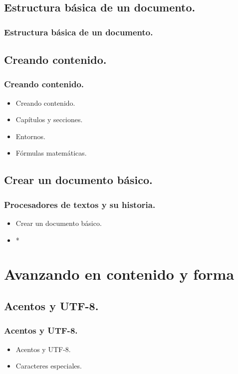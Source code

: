 \documentclass{beamer}
\begin{document}
\subsection{Estructura básica de un documento.}
\begin{frame}
  \frametitle{Estructura básica de un documento.}
\end{frame}

\subsection{Creando contenido.}
\begin{frame}
  \frametitle{Creando contenido.}
  \begin{itemize}
  \item<1->{Creando contenido.}
  \item<2->{Capítulos y secciones.}
  \item<3->{Entornos.}
  \item<4->{Fórmulas matemáticas.}
  \end{itemize}
\end{frame}

\subsection{Crear un documento básico.}
\begin{frame}
  \frametitle{Procesadores de textos y su historia.}
  \begin{itemize}
  \item<1->{Crear un documento básico.}
  \item<2->{*}
  \end{itemize}
\end{frame}

\section{Avanzando en contenido y forma}
\subsection{Acentos y UTF-8.}
\begin{frame}
  \frametitle{Acentos y UTF-8.}
  \begin{itemize}
   \item<1->{Acentos y UTF-8.}
   \item<2->{Caracteres especiales.}
  \end{itemize}
\end{frame}
\end{document}
